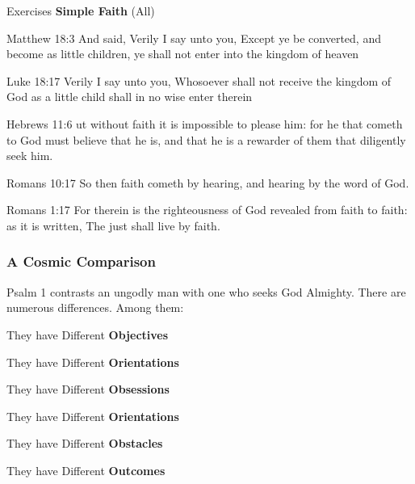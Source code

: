\begin{compactenum}[I.]
\begin{compactenum}[A.]
    \end{compactenum}
    \item Exercises \textbf{Simple Faith} (All)
    \begin{compactenum}[A.]
		\item Matthew 18:3 And said, Verily I say unto you, Except ye be converted, and become as little children, ye shall not enter into the kingdom of heaven
		\item Luke 18:17 Verily I say unto you, Whosoever shall not receive the kingdom of God as a little child shall in no wise enter therein
		\item Hebrews 11:6 ut without faith it is impossible to please him: for he that cometh to God must believe that he is, and that he is a rewarder of them that diligently seek him.
		\item Romans 10:17  So then faith cometh by hearing, and hearing by the word of God.
		\item Romans 1:17  For therein is the righteousness of God revealed from faith to faith: as it is written, The just shall live by faith.
    \end{compactenum}
\end{compactenum}

\subsubsection{A Cosmic Comparison}
Psalm 1 contrasts an ungodly man with one who seeks God Almighty. There are numerous differences.  Among them: %
\begin{compactenum}[I.]
    \item They have Different \textbf{Objectives}
    \item They have Different \textbf{Orientations}
    \item They have Different \textbf{Obsessions}
    \item They have Different \textbf{Orientations}
    \item They have Different \textbf{Obstacles}
    \item They have Different \textbf{Outcomes}
\end{compactenum}

